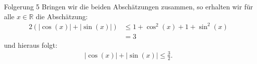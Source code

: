 \documentclass[10pt]{beamer}
\def\bR{\mathbb{R}}
\begin{document}
\begin{frame}{Folgerung 5}
    Bringen wir die beiden Abschätzungen zusammen, so erhalten wir für alle \( x \in \bR \) die Abschätzung:
    \begin{align*}
        2 \left( \left\vert \cos\left( x \right) \right\vert + \left\vert \sin\left( x \right) \right\vert \right)
        & \leq 1 + \cos^{2}\left( x \right) + 1 + \sin^{2}\left( x \right) \\
        & = 3
    \end{align*}
    und hieraus folgt:
    \begin{align*}
        \left\vert \cos\left( x \right) \right\vert + \left\vert \sin\left( x \right) \right\vert
        \leq \frac{3}{2}.
    \end{align*}
\end{frame}
\end{document}
